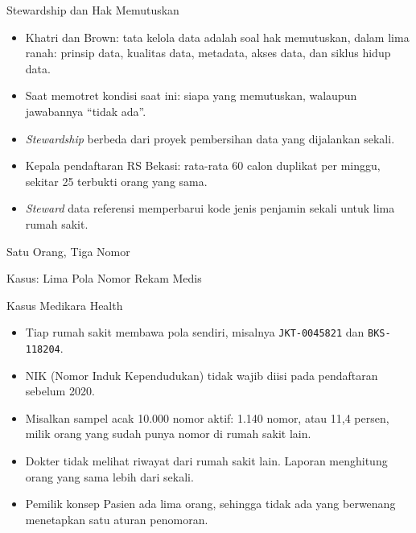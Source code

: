 \documentclass[aspectratio=169, table, 12pt]{beamer}
\begin{document}
\begin{frame}{{\Large Stewardship dan Hak Memutuskan}}
  \vspace{6pt}
  \small
  \begin{itemize}
    \item Khatri dan Brown: tata kelola data adalah soal hak memutuskan, dalam lima ranah: prinsip data,
          kualitas data, metadata, akses data, dan siklus hidup data.
    \item Saat memotret kondisi saat ini: siapa yang memutuskan, walaupun jawabannya ``tidak ada''.
    \item \textit{Stewardship} berbeda dari proyek pembersihan data yang dijalankan sekali.
    \item Kepala pendaftaran RS Bekasi: rata-rata 60 calon duplikat per minggu, sekitar 25 terbukti orang
          yang sama.
    \item \textit{Steward} data referensi memperbarui kode jenis penjamin sekali untuk lima rumah sakit.
  \end{itemize}
\end{frame}

\begin{frame}{{\Large Satu Orang, Tiga Nomor}}
  \centering
\end{frame}

\begin{frame}{{\Large Kasus: Lima Pola Nomor Rekam Medis}}
  \begin{block}{Kasus Medikara Health}
    \small
    \begin{itemize}
      \item Tiap rumah sakit membawa pola sendiri, misalnya \texttt{JKT-0045821} dan \texttt{BKS-118204}.
      \item NIK (Nomor Induk Kependudukan) tidak wajib diisi pada pendaftaran sebelum 2020.
      \item Misalkan sampel acak 10.000 nomor aktif: 1.140 nomor, atau 11,4 persen, milik orang yang sudah
            punya nomor di rumah sakit lain.
      \item Dokter tidak melihat riwayat dari rumah sakit lain. Laporan menghitung orang yang sama lebih
            dari sekali.
      \item Pemilik konsep Pasien ada lima orang, sehingga tidak ada yang berwenang menetapkan satu aturan
            penomoran.
    \end{itemize}
  \end{block}
\end{frame}
\end{document}
